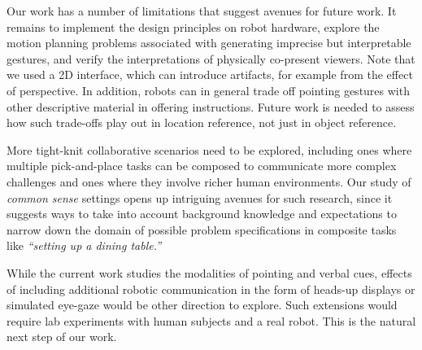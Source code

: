 \documentclass[letterpaper]{article} %
\begin{document}
Our work has a number of limitations that suggest avenues for future work.   It remains to implement the design principles on robot hardware, explore the motion planning problems associated with generating imprecise but interpretable gestures, and verify the interpretations of physically co-present viewers.  Note that we used a 2D interface, which can introduce artifacts, for example from the effect of perspective.  In addition, robots can in general trade off pointing gestures with other descriptive material in offering instructions.  Future work is needed to assess how such trade-offs play out in location reference, not just in object reference.


More tight-knit collaborative scenarios need to be explored, including ones where multiple pick-and-place tasks can be composed to communicate more complex challenges and ones where they involve richer human environments.  Our study of  \textit{common sense} settings opens up intriguing avenues for such research, since it suggests ways to take into account background knowledge and expectations to narrow down the domain of possible problem specifications in composite tasks like \textit{``setting up a dining table.''} 

While the current work studies the modalities of pointing and verbal cues, effects of including additional robotic communication in the form of heads-up displays or simulated eye-gaze would be other direction to explore. Such extensions would require lab experiments with human subjects and a real robot.  This is the natural next step of our work. 

\end{document}
